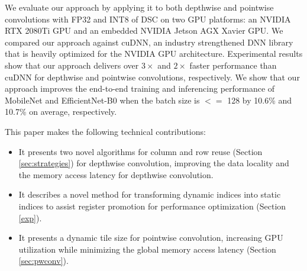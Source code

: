 We evaluate our approach by applying it to both depthwise and pointwise convolutions with FP32 and INT8 of DSC on two GPU platforms: an NVIDIA RTX 2080Ti GPU
and an embedded NVIDIA Jetson AGX Xavier GPU. We compared our approach against cuDNN, an industry strengthened DNN library that is heavily
optimized for the NVIDIA GPU architecture. Experimental results show that our approach delivers over $3\times$ and $2\times$ faster
performance than cuDNN for depthwise and pointwise convolutions, respectively. We show that our approach improves the end-to-end training and inferencing performance of MobileNet \cite{Sandler_2018_CVPR,howard2019searching} and EfficientNet-B0 \cite{tan2019efficientnet} when the batch size is $<=$ 128 by 10.6\% and 10.7\% on average, respectively.



This paper makes the following technical contributions:
\begin{itemize}
    \item It presents two novel algorithms for column and row reuse (Section \ref{sec:strategies}) for depthwise
        convolution, improving the data locality and the memory access latency for depthwise convolution.
    \item It describes a novel method for transforming dynamic indices into static indices to assist register promotion for performance
        optimization (Section \ref{exp}).
    \item It presents a dynamic tile size for pointwise convolution, increasing GPU utilization while minimizing the global memory
        access latency (Section \ref{sec:pwconv}).
\end{itemize}
